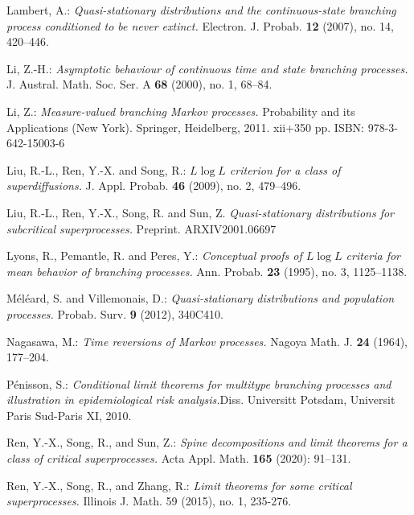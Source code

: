 \documentclass[12pt,a4paper]{amsart}
\numberwithin{equation}{section}
\theoremstyle{plain}
\theoremstyle{definition}
\theoremstyle{remark}
\begin{document}
\begin{thebibliography}{99}
Lambert, A.:
\emph{Quasi-stationary distributions and the continuous-state branching process conditioned to be never extinct.}
Electron. J. Probab. \textbf{12} (2007), no. 14, 420--446.

Li, Z.-H.:
\emph{Asymptotic behaviour of continuous time and state branching processes.}
J. Austral. Math. Soc. Ser. A \textbf{68} (2000), no. 1, 68--84.

Li, Z.:
\emph{Measure-valued branching Markov processes.}
Probability and its Applications (New York). Springer, Heidelberg, 2011. xii+350 pp. ISBN: 978-3-642-15003-6

Liu, R.-L., Ren, Y.-X. and Song, R.:
\emph{{$L \log L$} criterion for a class of superdiffusions.}
J. Appl. Probab. \textbf{46} (2009), no. 2, 479--496.

Liu, R.-L., Ren, Y.-X., Song, R. and Sun, Z.
\emph{Quasi-stationary distributions for subcritical superprocesses.}
Preprint.
ARXIV{2001.06697}

Lyons, R., Pemantle, R. and Peres, Y.:
\emph{Conceptual proofs of $L\log L$ criteria for mean behavior of branching processes.}
Ann. Probab. \textbf{23} (1995), no. 3, 1125--1138.

M\'el\'eard, S. and Villemonais, D.:
\emph{Quasi-stationary distributions and population processes.}
Probab. Surv. \textbf{9} (2012), 340C410.

Nagasawa, M.:
\emph{Time reversions of Markov processes.}
Nagoya Math. J. \textbf{24} (1964), 177--204.

P\'enisson, S.:
\emph{Conditional limit theorems for multitype branching processes and illustration in epidemiological risk analysis.}Diss. Universitt Potsdam, Universit Paris Sud-Paris XI, 2010.

	Ren, Y.-X., Song, R., and Sun, Z.:
	\emph{Spine decompositions and limit theorems for a class of critical superprocesses.}
	Acta Appl. Math. \textbf{165} (2020): 91--131.

Ren, Y.-X., Song, R., and Zhang, R.:
\emph{Limit theorems for some critical superprocesses.}
Illinois J. Math. 59 (2015), no. 1, 235-276.


\end{thebibliography}
\end{document}
